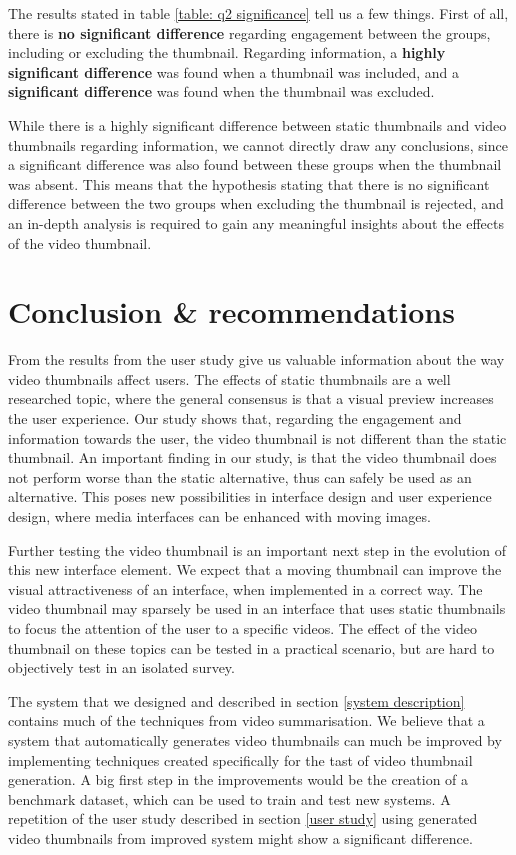 \documentclass{../resources/sig-alternate-05-2015}
\begin{document}
The results stated in table \ref{table: q2 significance} tell us a few things. First of all, there is \textbf{no significant difference} regarding engagement between the groups, including or excluding the thumbnail. Regarding information, a \textbf{highly significant difference} was found when a thumbnail was included, and a \textbf{significant difference} was found when the thumbnail was excluded.

While there is a highly significant difference between static thumbnails and video thumbnails regarding information, we cannot directly draw any conclusions, since a significant difference was also found between these groups when the thumbnail was absent. This means that the hypothesis stating that there is no significant difference between the two groups when excluding the thumbnail is rejected, and an in-depth analysis is required to gain any meaningful insights about the effects of the video thumbnail.





\section{Conclusion \& recommendations}

From the results from the user study give us valuable information about the way video thumbnails affect users. The effects of static thumbnails are a well researched topic, where the general consensus is that a visual preview increases the user experience. Our study shows that, regarding the engagement and information towards the user, the video thumbnail is not different than the static thumbnail. An important finding in our study, is that the video thumbnail does not perform worse than the static alternative, thus can safely be used as an alternative. This poses new possibilities in interface design and user experience design, where media interfaces can be enhanced with moving images.

Further testing the video thumbnail is an important next step in the evolution of this new interface element. We expect that a moving thumbnail can improve the visual attractiveness of an interface, when implemented in a correct way. The video thumbnail may sparsely be used in an interface that uses static thumbnails to focus the attention of the user to a specific videos. The effect of the video thumbnail on these topics can be tested in a practical scenario, but are hard to objectively test in an isolated survey.

The system that we designed and described in section \ref{system description} contains much of the techniques from video summarisation. We believe that a system that automatically generates video thumbnails can much be improved by implementing techniques created specifically for the tast of video thumbnail generation. A big first step in the improvements would be the creation of a benchmark dataset, which can be used to train and test new systems. A repetition of the user study described in section \ref{user study} using generated video thumbnails from improved system might show a significant difference.



\printbibliography
\end{document}
